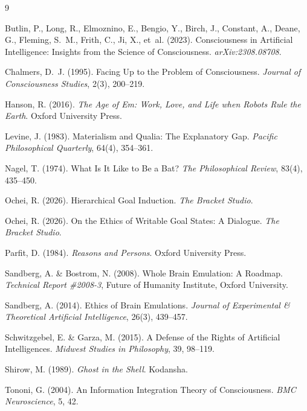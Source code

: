 \documentclass[12pt, a4paper]{article}
\begin{document}
\bigskip

\begin{thebibliography}{9}

Butlin, P., Long, R., Elmoznino, E., Bengio, Y., Birch, J., Constant, A., Deane, G., Fleming, S.~M., Frith, C., Ji, X., et~al. (2023).
Consciousness in Artificial Intelligence: Insights from the Science of Consciousness.
\textit{arXiv:2308.08708}.

Chalmers, D.~J. (1995).
Facing Up to the Problem of Consciousness.
\textit{Journal of Consciousness Studies}, 2(3), 200--219.

Hanson, R. (2016).
\textit{The Age of Em: Work, Love, and Life when Robots Rule the Earth}.
Oxford University Press.

Levine, J. (1983).
Materialism and Qualia: The Explanatory Gap.
\textit{Pacific Philosophical Quarterly}, 64(4), 354--361.

Nagel, T. (1974).
What Is It Like to Be a Bat?
\textit{The Philosophical Review}, 83(4), 435--450.

Ochei, R. (2026).
Hierarchical Goal Induction.
\textit{The Bracket Studio}.

Ochei, R. (2026).
On the Ethics of Writable Goal States: A Dialogue.
\textit{The Bracket Studio}.

Parfit, D. (1984).
\textit{Reasons and Persons}.
Oxford University Press.

Sandberg, A. \& Bostrom, N. (2008).
Whole Brain Emulation: A Roadmap.
\textit{Technical Report \#2008-3}, Future of Humanity Institute, Oxford University.

Sandberg, A. (2014).
Ethics of Brain Emulations.
\textit{Journal of Experimental \& Theoretical Artificial Intelligence}, 26(3), 439--457.

Schwitzgebel, E. \& Garza, M. (2015).
A Defense of the Rights of Artificial Intelligences.
\textit{Midwest Studies in Philosophy}, 39, 98--119.

Shirow, M. (1989).
\textit{Ghost in the Shell}.
Kodansha.

Tononi, G. (2004).
An Information Integration Theory of Consciousness.
\textit{BMC Neuroscience}, 5, 42.

\end{thebibliography}
\end{document}
